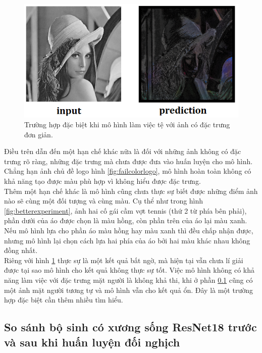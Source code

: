 \documentclass[a4paper, 12pt]{article}
\begin{document}
\begin{figure}[!h]
\captionsetup{width=0.8\textwidth}
\centering
\includegraphics[width=12cm]{images/4_13.png}
\caption{Trường hợp đặc biệt khi mô hình làm việc tệ với ảnh có đặc trưng đơn giản.}
\label{fig:edgecase}
\end{figure}

\noindent
Điều trên dẫn đến một hạn chế khác nữa là đối với những ảnh không có đặc trưng rõ ràng, những đặc trưng mà chưa được đưa vào huấn luyện cho mô hình. Chẳng hạn ảnh chủ đề logo hình \ref{fig:failcolorlogo}, mô hình hoàn toàn không có khả năng tạo được màu phù hợp vì không hiểu được đặc trưng.\vspace{5pt}\\
Thêm một hạn chế khác là mô hình cũng chưa thực sự biết được những điểm ảnh nào sẽ cùng một đối tượng và cùng màu. Cụ thể như trong hình \ref{fig:betterexperiment}, ảnh hai cố gái cầm vợt tennis (thứ 2 từ phía bên phải), phần dưới của áo được chọn là màu hồng, còn phần trên của áo lại màu xanh. Nếu mô hình lựa cho phần áo màu hồng hay màu xanh thì đều chấp nhận được, nhưng mô hình lại chọn cách lựa hai phía của áo bởi hai màu khác nhau không đồng nhất.\vspace{5pt}\\
Riêng với hình \ref{fig:edgecase} thực sự là một kết quả bất ngờ, mà hiện tại vẫn chưa lí giải được tại sao mô hình cho kết quả không thực sự tốt. Việc mô hình không có khả năng làm việc với đặc trưng mặt người là không khả thi, khi ở phần \ref{compare} cũng có một ảnh mặt người tương tự và mô hình vẫn cho kết quả ổn. Đây là một trường hợp đặc biệt cần thêm nhiều tìm hiểu.

\subsection{So sánh bộ sinh có xương sống ResNet18 trước và sau khi huấn luyện đối nghịch}\label{compare}
\end{document}
